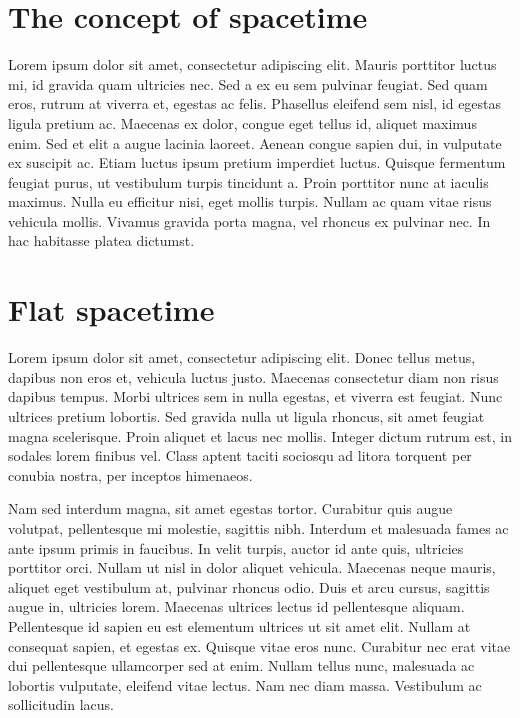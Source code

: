 \documentclass[natbib]{muthesis}
\begin{document}
  \section{The concept of spacetime}
  Lorem ipsum dolor sit amet, consectetur adipiscing elit. Mauris porttitor luctus mi, id gravida quam ultricies nec. Sed a ex eu sem pulvinar feugiat. Sed quam eros, rutrum at viverra et, egestas ac felis. Phasellus eleifend sem nisl, id egestas ligula pretium ac. Maecenas ex dolor, congue eget tellus id, aliquet maximus enim. Sed et elit a augue lacinia laoreet. Aenean congue sapien dui, in vulputate ex suscipit ac. Etiam luctus ipsum pretium imperdiet luctus. Quisque fermentum feugiat purus, ut vestibulum turpis tincidunt a. Proin porttitor nunc at iaculis maximus. Nulla eu efficitur nisi, eget mollis turpis. Nullam ac quam vitae risus vehicula mollis. Vivamus gravida porta magna, vel rhoncus ex pulvinar nec. In hac habitasse platea dictumst.


  \section{Flat spacetime}

  Lorem ipsum dolor sit amet, consectetur adipiscing elit. Donec tellus metus, dapibus non eros et, vehicula luctus justo. Maecenas consectetur diam non risus dapibus tempus. Morbi ultrices sem in nulla egestas, et viverra est feugiat. Nunc ultrices pretium lobortis. Sed gravida nulla ut ligula rhoncus, sit amet feugiat magna scelerisque. Proin aliquet et lacus nec mollis. Integer dictum rutrum est, in sodales lorem finibus vel. Class aptent taciti sociosqu ad litora torquent per conubia nostra, per inceptos himenaeos.

  Nam sed interdum magna, sit amet egestas tortor. Curabitur quis augue volutpat, pellentesque mi molestie, sagittis nibh. Interdum et malesuada fames ac ante ipsum primis in faucibus. In velit turpis, auctor id ante quis, ultricies porttitor orci. Nullam ut nisl in dolor aliquet vehicula. Maecenas neque mauris, aliquet eget vestibulum at, pulvinar rhoncus odio. Duis et arcu cursus, sagittis augue in, ultricies lorem. Maecenas ultrices lectus id pellentesque aliquam. Pellentesque id sapien eu est elementum ultrices ut sit amet elit. Nullam at consequat sapien, et egestas ex. Quisque vitae eros nunc. Curabitur nec erat vitae dui pellentesque ullamcorper sed at enim. Nullam tellus nunc, malesuada ac lobortis vulputate, eleifend vitae lectus. Nam nec diam massa. Vestibulum ac sollicitudin lacus.
\end{document}
